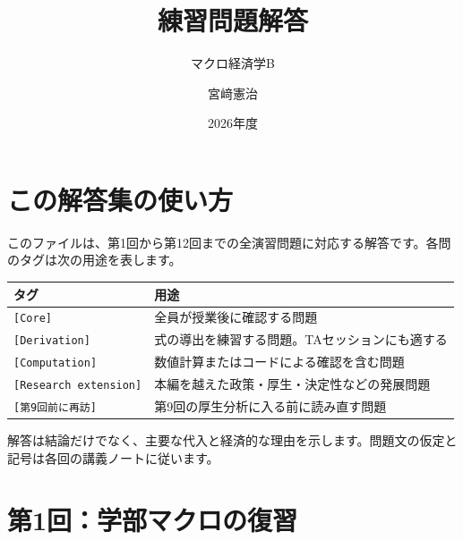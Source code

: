 \documentclass[
  japanese,
  lualatex,
  ja=standard,
  11pt,
  a4paper]{ltjsarticle}
\title{練習問題解答}
\subtitle{マクロ経済学B}
\author{宮﨑憲治}
\date{2026年度}
\newcounter{none} %
\renewcommand*\contentsname{目次}
\newcommand\contentsname{目次}
\begin{document}
\maketitle

\renewcommand*\contentsname{目次}
{
\setcounter{tocdepth}{3}
\tableofcontents
}

\section{この解答集の使い方}\label{ux3053ux306eux89e3ux7b54ux96c6ux306eux4f7fux3044ux65b9}

このファイルは、第1回から第12回までの全演習問題に対応する解答です。各問のタグは次の用途を表します。

{\def\LTcaptype{none} %
\begin{longtable}[]{@{}
  >{\raggedright\arraybackslash}p{}
  >{\raggedright\arraybackslash}p{}@{}}
\toprule\noalign{}
\begin{minipage}[b]{\linewidth}\raggedright
タグ
\end{minipage} & \begin{minipage}[b]{\linewidth}\raggedright
用途
\end{minipage} \\
\midrule\noalign{}
\endhead
\bottomrule\noalign{}
\endlastfoot
\texttt{{[}Core{]}} & 全員が授業後に確認する問題 \\
\texttt{{[}Derivation{]}} &
式の導出を練習する問題。TAセッションにも適する \\
\texttt{{[}Computation{]}} & 数値計算またはコードによる確認を含む問題 \\
\texttt{{[}Research\ extension{]}} &
本編を越えた政策・厚生・決定性などの発展問題 \\
\texttt{{[}第9回前に再訪{]}} & 第9回の厚生分析に入る前に読み直す問題 \\
\end{longtable}
}

解答は結論だけでなく、主要な代入と経済的な理由を示します。問題文の仮定と記号は各回の講義ノートに従います。

\clearpage

\section{第1回：学部マクロの復習}\label{ux7b2c1ux56deux5b66ux90e8ux30deux30afux30edux306eux5fa9ux7fd2}
\end{document}
